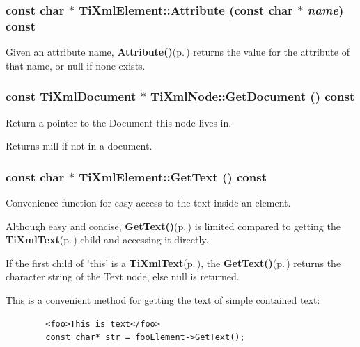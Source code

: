 \subsubsection{\setlength{\rightskip}{0pt plus 5cm}const char $\ast$ Ti\-Xml\-Element::Attribute (const char $\ast$ {\em name}) const}\label{classTiXmlElement_TiXmlElementa5}


Given an attribute name, {\bf Attribute()}{\rm (p.\,\pageref{classTiXmlElement_TiXmlElementa5})} returns the value for the attribute of that name, or null if none exists. 

\subsubsection{\setlength{\rightskip}{0pt plus 5cm}const {\bf Ti\-Xml\-Document} $\ast$ Ti\-Xml\-Node::Get\-Document () const\hspace{0.3cm}{\tt  [inherited]}}\label{classTiXmlNode_TiXmlUnknowna63}


Return a pointer to the Document this node lives in. 

Returns null if not in a document.
\subsubsection{\setlength{\rightskip}{0pt plus 5cm}const char $\ast$ Ti\-Xml\-Element::Get\-Text () const}\label{classTiXmlElement_TiXmlElementa27}


Convenience function for easy access to the text inside an element. 

Although easy and concise, {\bf Get\-Text()}{\rm (p.\,\pageref{classTiXmlElement_TiXmlElementa27})} is limited compared to getting the {\bf Ti\-Xml\-Text}{\rm (p.\,\pageref{classTiXmlText})} child and accessing it directly.

If the first child of 'this' is a {\bf Ti\-Xml\-Text}{\rm (p.\,\pageref{classTiXmlText})}, the {\bf Get\-Text()}{\rm (p.\,\pageref{classTiXmlElement_TiXmlElementa27})} returns the character string of the Text node, else null is returned.

This is a convenient method for getting the text of simple contained text: 

\footnotesize\begin{verbatim}
		<foo>This is text</foo>
		const char* str = fooElement->GetText();
		\end{verbatim}
\normalsize


